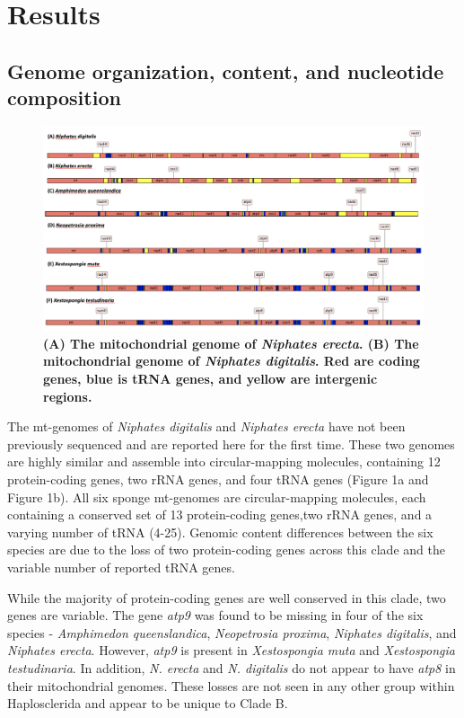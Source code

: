 \documentclass[../main.tex]{subfiles}
\begin{document}
\section{Results}

\subsection {Genome organization, content, and nucleotide composition}

\begin{figure}[htp]
    \centering
    \includegraphics[width=1.0\textwidth]{Figures/figure 1 replace.png}
    \caption{\textbf{(A) The mitochondrial genome of \emph{Niphates erecta}. (B) The mitochondrial genome of \emph{Niphates digitalis}. Red are coding genes, blue is tRNA genes, and yellow are intergenic regions.}}
\end{figure}

The mt-genomes of \emph{Niphates digitalis} and \emph{Niphates erecta} have not been previously sequenced and are reported here for the first time. These two genomes are highly similar and assemble into circular-mapping molecules, containing 12 protein-coding genes, two rRNA genes, and four tRNA genes (Figure 1a and Figure 1b). All six sponge mt-genomes are circular-mapping molecules, each containing a conserved set of 13 protein-coding genes,two rRNA genes, and a varying number of tRNA (4-25). Genomic content differences between the six species are due to the loss of two protein-coding genes across this clade and the variable number of reported tRNA genes.

While the majority of protein-coding genes are well conserved in this clade, two genes are variable. The gene \emph{atp9} was found to be missing in four of the six species - \emph{Amphimedon queenslandica}, \emph{Neopetrosia proxima}, \emph{Niphates digitalis}, and \emph{Niphates erecta}. However, \emph{atp9} is present in \emph{Xestospongia muta} and \emph{Xestospongia testudinaria}. In addition, \emph{N. erecta} and \emph{N. digitalis} do not appear to have \emph{atp8} in their mitochondrial genomes. These losses are not seen in any other group within Haplosclerida and appear to be unique to Clade B. 
\end{document}
